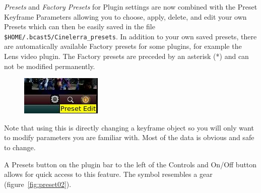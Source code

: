 \textit{Presets} and \textit{Factory Presets} for Plugin settings are now combined with the Preset Keyframe Parameters allowing you to choose, apply, delete, and edit your own Presets which can then be easily saved in the file \texttt{\$HOME/.bcast5/Cinelerra\_presets}. In addition to your own saved presets, there are automatically available Factory presets for some plugins, for example the Lens video plugin. The Factory presets are preceded by an asterisk (*) and can not be modified permanently.

\begin{figure}
    \vspace{-4ex}
    \centering
    \includegraphics[width=0.7\linewidth]{images/preset.png} 
\end{figure}
Note that using this is directly changing a keyframe object so you will only want to modify parameters you are familiar with. Most of the data is obvious and safe to change.

A Presets button on the plugin bar to the left of the Controls and On/Off button allows for quick access to this feature. The symbol resembles a gear (figure~\ref{fig:preset02}).

